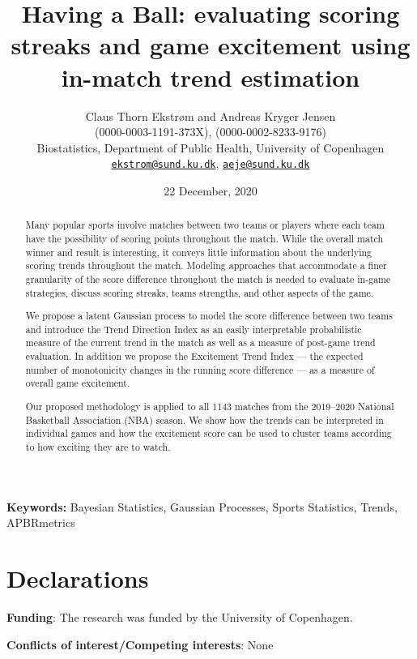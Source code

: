 \documentclass[
  11pt,
]{svjour3}
\institute{Biostatistics, Department of Public Health\\University of Copenhagen\\ Øster Farimagsgade 5\\ 1014 København K\\ DENMARK}
\title{Having a Ball: evaluating scoring streaks and game excitement using
in-match trend estimation}
\author{Claus Thorn Ekstrøm and Andreas Kryger Jensen\\
(0000-0003-1191-373X), (0000-0002-8233-9176)\\
Biostatistics, Department of Public Health, University of Copenhagen\\
\href{mailto:ekstrom@sund.ku.dk}{\nolinkurl{ekstrom@sund.ku.dk}},
\href{mailto:aeje@sund.ku.dk}{\nolinkurl{aeje@sund.ku.dk}}}
\date{22 December, 2020}
\theoremstyle{nonumberplain}
\begin{document}
\maketitle

\newpage

\setcounter{bbsym4theta}{0}

\begin{abstract}

Many popular sports involve matches between two teams or players where
each team have the possibility of scoring points throughout the match. While
the overall match winner and result is interesting, it conveys little
information about the underlying scoring trends throughout the
match. Modeling approaches that accommodate a finer granularity of the
score difference throughout the match is needed to evaluate
in-game strategies, discuss scoring streaks, teams strengths, and other
aspects of the game.

We propose a latent Gaussian process to model the score difference
between two teams and introduce the Trend Direction Index as an easily
interpretable probabilistic measure of the current trend in the match
as well as a measure of post-game trend evaluation. In addition we
propose the Excitement Trend Index --- the expected number of
monotonicity changes in the running score difference ---
as a measure of overall game excitement.

Our proposed methodology is applied to all 1143 matches from
the 2019--2020 National Basketball Association (NBA) season. We show
how the trends can be interpreted in individual games and how the
excitement score can be used to cluster teams according to how
exciting they are to watch.
\end{abstract}

\begin{center}
\textbf{Keywords:} Bayesian Statistics, Gaussian Processes, Sports Statistics, Trends, APBRmetrics
\end{center}

\hypertarget{declarations}{%
\section*{Declarations}\label{declarations}}

\textbf{Funding}: The research was funded by the University of
Copenhagen.

\textbf{Conflicts of interest/Competing interests}: None
\end{document}
